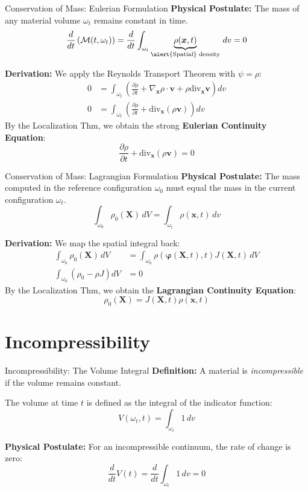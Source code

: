 \documentclass[aspectratio=169]{beamer}
\begin{document}
\begin{frame}{Conservation of Mass: Eulerian Formulation}
    \textbf{Physical Postulate:} The mass of any material volume $\omega_t$ remains constant in time.
    $$ \frac{d}{dt}\left(\mathcal M(t, \omega_t)\right) = \frac{d}{dt} \int_{\omega_t} \underbrace{\rho(\bm{x}, t)}_\text{\alert{Spatial} density} \, dv = 0 $$
    
    \textbf{Derivation:}
    We apply the Reynolds Transport Theorem with $\psi = \rho$:
    \begin{align*}
        0 &= \int_{\omega_t} \left( \frac{\partial \rho}{\partial t} + \nabla_{\bm{x}} \rho \cdot \bm{v} + \rho \text{div}_{\bm{x}} \bm{v} \right) dv \tag{RTT} \\
        0 &= \int_{\omega_t} \left( \frac{\partial \rho}{\partial t} + \text{div}_{\bm{x}} (\rho \bm{v}) \right) dv \tag{Product Rule}
    \end{align*}
    By the Localization Thm, we obtain the strong \textbf{Eulerian Continuity Equation}:
    $$ \frac{\partial \rho}{\partial t} + \text{div}_{\bm{x}} (\rho \bm{v}) = 0 $$
\end{frame}

\begin{frame}{Conservation of Mass: Lagrangian Formulation}
    \textbf{Physical Postulate:} The mass computed in the reference configuration $\omega_0$ must equal the mass in the current configuration $\omega_t$.
    $$ \int_{\omega_0} \rho_0(\bm{X}) \, dV = \int_{\omega_t} \rho(\bm{x}, t) \, dv $$
    
    \textbf{Derivation:} We map the spatial integral back:
    \begin{align*}
        \int_{\omega_0} \rho_0(\bm{X}) \, dV &= \int_{\omega_0} \rho(\bm{\varphi}(\bm{X},t), t) J(\bm{X},t) \, dV \tag{Change of variables} \\
        \int_{\omega_0} \left( \rho_0 - \rho J \right) dV &= 0 \tag{Rearrange}
    \end{align*}
    By the Localization Thm, we obtain the \textbf{Lagrangian Continuity Equation}:
    $$ \rho_0(\bm{X}) = J(\bm{X},t) \rho(\bm{x},t) $$
\end{frame}

\section{Incompressibility}

\begin{frame}{Incompressibility: The Volume Integral}
    \textbf{Definition:} A material is \textit{incompressible} if the volume remains constant.
    
    The volume at time $t$ is defined as the integral of the indicator function:
    $$ V(\omega_t, t) = \int_{\omega_t} 1 \, dv $$
    
    \textbf{Physical Postulate:} For an incompressible continuum, the rate of change is zero:
    $$ \frac{d}{dt} V(t) = \frac{d}{dt} \int_{\omega_t} 1 \, dv = 0 $$
\end{frame}
\end{document}
